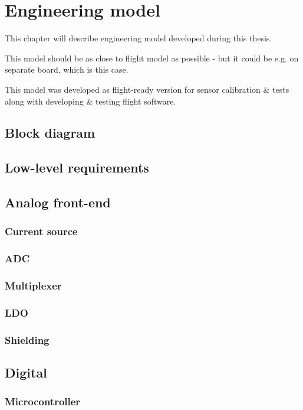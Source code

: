 \chapter{Engineering model}
This chapter will describe engineering model developed during this thesis. 

This model should be as close to flight model as possible - but it could be e.g. on separate board, which is this case. 

This model was developed as flight-ready version for sensor calibration \& tests along with developing \& testing flight software.

\section{Block diagram}

\section{Low-level requirements}

\section{Analog front-end}
\subsection{Current source}
\subsection{ADC}
\subsection{Multiplexer}
\subsection{LDO}
\subsection{Shielding}

\section{Digital}
\subsection{Microcontroller}
